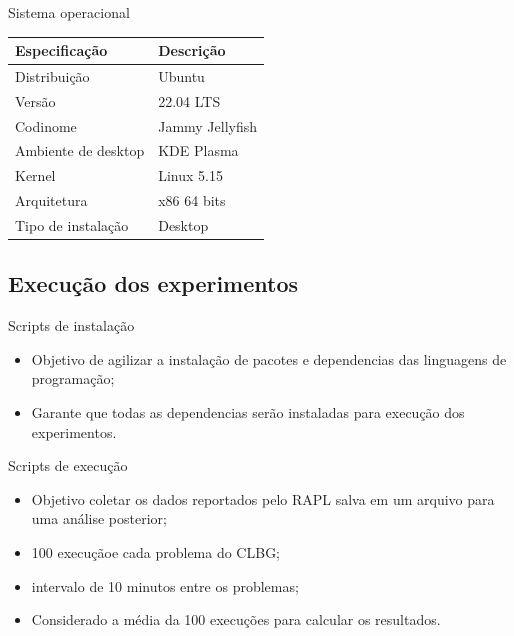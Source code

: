 \begin{frame}{Sistema operacional}
    \centering
    \begin{table}[h]
        \centering
        \begin{tabular}{l|l}
            \textbf{Especificação} & \textbf{Descrição} \\
            \toprule
            Distribuição & Ubuntu \\
            \hline
            Versão & 22.04 LTS  \\
            \hline
            Codinome & Jammy Jellyfish \\
            \hline
            Ambiente de desktop & KDE Plasma \\
            \hline
            Kernel & Linux 5.15 \\
            \hline
            Arquitetura & x86 64 bits \\
            \hline
            Tipo de instalação & Desktop\\
        \end{tabular}
    \end{table}
\end{frame}

\subsection{Execução dos experimentos}

\begin{frame}{Scripts de instalação}
    \begin{itemize}
        \item Objetivo de agilizar a instalação de pacotes e dependencias das linguagens de programação;
        \item Garante que todas as dependencias serão instaladas para execução dos experimentos.
    \end{itemize}
\end{frame}

\begin{frame}{Scripts de execução}
    \begin{itemize}
        \item Objetivo coletar os dados reportados pelo RAPL salva em um arquivo para uma análise posterior;
        \item 100 execuçãoe cada problema do CLBG;
        \item intervalo de 10 minutos entre os problemas;
        \item Considerado a média da 100 execuções para calcular os resultados.
    \end{itemize}
\end{frame}

